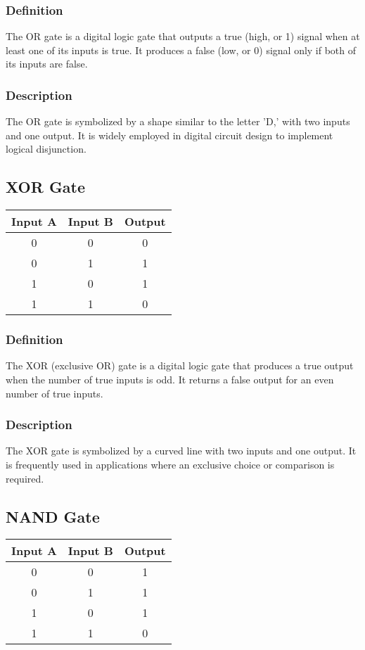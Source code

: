 \documentclass{article}
\begin{document}
\subsubsection{Definition} 
The OR gate is a digital logic gate that outputs a true (high, or 1) signal when at least one of its inputs is true. It produces a false (low, or 0) signal only if both of its inputs are false.

\subsubsection{Description} 
The OR gate is symbolized by a shape similar to the letter 'D,' with two inputs and one output. It is widely employed in digital circuit design to implement logical disjunction.

\subsection{XOR Gate}
\begin{center}
  \begin{tabular}{|c|c|c|}
    \hline
    \textbf{Input A} & \textbf{Input B} & \textbf{Output} \\
    \hline
    0 & 0 & 0 \\
    0 & 1 & 1 \\
    1 & 0 & 1 \\
    1 & 1 & 0 \\
    \hline
  \end{tabular}
\end{center}

\subsubsection{Definition} 
The XOR (exclusive OR) gate is a digital logic gate that produces a true output when the number of true inputs is odd. It returns a false output for an even number of true inputs.

\subsubsection{Description} 
The XOR gate is symbolized by a curved line with two inputs and one output. It is frequently used in applications where an exclusive choice or comparison is required.

\subsection{NAND Gate}
\begin{center}
  \begin{tabular}{|c|c|c|}
    \hline
    \textbf{Input A} & \textbf{Input B} & \textbf{Output} \\
    \hline
    0 & 0 & 1 \\
    0 & 1 & 1 \\
    1 & 0 & 1 \\
    1 & 1 & 0 \\
    \hline
  \end{tabular}
\end{center}
\end{document}
